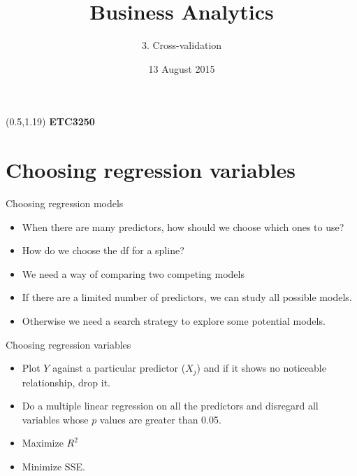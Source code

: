 \documentclass[14pt]{beamer}
\title[3. Cross-validation]{Business Analytics}
\author{3. Cross-validation}
\date{13 August 2015}
\makeatletter
\def\biz{\begin{itemize}[<+-| alert@+>]}
\def\eiz{\end{itemize}}
\makeatother
\begin{document}
\begin{frame}[plain]{}
\maketitle
\begin{textblock}{11}(0.5,1.19){\color{white}\large
\textbf{ETC3250}}
\end{textblock}
\end{frame}


\section{Choosing regression variables}

\begin{frame}{Choosing regression models}
\biz
\item When there are many predictors, how should we choose which ones to use?

\item How do we choose the df for a spline?

\item We need a way of comparing two competing models

\item If there are a limited number of predictors, we can study all possible models.

\item Otherwise we need a search strategy to explore some potential models.
\eiz

\end{frame}


\begin{frame}{Choosing regression variables}


\biz
\item Plot $Y$ against a particular predictor ($X_j$)
       and if it shows no noticeable relationship,  drop it.


\item Do a multiple linear regression on all the predictors
      and
      disregard all variables whose  $p$ values are greater than 0.05.

\item Maximize $R^2$

\item Minimize SSE.
\eiz
\end{frame}%
\end{document}
